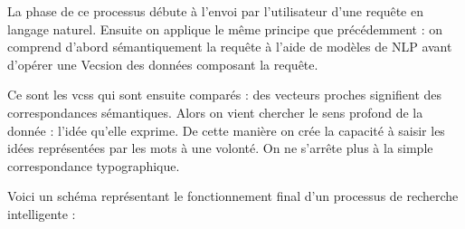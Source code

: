 \vspace{0.1cm}

La phase  de ce processus débute à l'envoi par l'utilisateur d'une requête en langage naturel. Ensuite on applique le même principe que précédemment : on comprend d'abord sémantiquement la requête à l'aide de modèles de \gls{NLP} avant d'opérer une \gls{Vecsion} des données composant la requête.

Ce sont les \glspl{vcs} qui sont ensuite comparés : des vecteurs proches signifient des correspondances sémantiques. Alors on vient chercher le sens profond de la donnée : l'idée qu'elle exprime. De cette manière on crée la capacité à saisir les idées représentées par les mots à une volonté. On ne s'arrête plus à la simple correspondance typographique.

Voici un schéma représentant le fonctionnement final d'un processus de recherche intelligente : 

